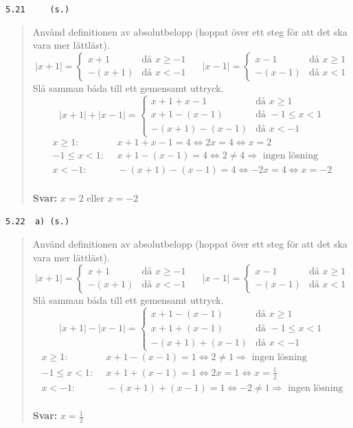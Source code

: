 \documentclass[a4paper]{article}
\newcommand{\tskcol}[1]{\textcolor{tskcol}{#1}}
\begin{document}
	\pagebreak
	\texttt{\tskcol{5.21~~~~ (s.)}}
	\begin{quotation}
		\noindent
		Använd definitionen av absolutbelopp (hoppat över ett steg för att det ska vara mer lättläst).
		\[|x+1|=
		\begin{cases}
		x+1&    \text{då } x \ge -1\\
		-(x+1)& \text{då } x < -1
		\end{cases}~~~~~~
		|x-1|=
		\begin{cases}
		x-1&    \text{då } x \ge 1\\
		-(x-1)& \text{då } x < 1
		\end{cases}\]
		Slå samman båda till ett gemensamt uttryck.
		\[|x+1|+|x-1|=
		\begin{cases}
		x+1+x-1&    \text{då } x \ge 1\\
		x+1-(x-1)& \text{då } -1 \le x < 1 \\
		-(x+1)-(x-1)& \text{då } x < -1 
		\end{cases}\]
		\begin{align*}
		     x \ge 1:&~~ x+1+x-1 = 4 \Leftrightarrow 2x=4 \Leftrightarrow x=2\\
		-1 \le x < 1:&~~ x+1-(x-1) = 4 \Leftrightarrow 2 \neq 4 \Rightarrow \text{ ingen lösning}\\
		      x < -1:&~~ -(x+1)-(x-1) = 4 \Leftrightarrow -2x = 4 \Leftrightarrow x = -2
		\end{align*}
		\\
		\textbf{Svar:} $x=2$ eller $x=-2$
	\end{quotation}
	
	\texttt{\tskcol{5.22~~a) (s.)}}
	\begin{quotation}
		\noindent
		Använd definitionen av absolutbelopp (hoppat över ett steg för att det ska vara mer lättläst).
		\[|x+1|=
		\begin{cases}
		x+1&    \text{då } x \ge -1\\
		-(x+1)& \text{då } x < -1
		\end{cases}~~~~~~
		|x-1|=
		\begin{cases}
		x-1&    \text{då } x \ge 1\\
		-(x-1)& \text{då } x < 1
		\end{cases}\]
		Slå samman båda till ett gemensamt uttryck.
		\[|x+1|-|x-1|=
		\begin{cases}
		x+1-(x-1)&    \text{då } x \ge 1\\
		x+1+(x-1)& \text{då } -1 \le x < 1 \\
		-(x+1)+(x-1)& \text{då } x < -1 
		\end{cases}\]
		\begin{align*}
		     x \ge 1:&~~ x+1-(x-1) = 1 \Leftrightarrow 2 \neq 1 \Rightarrow \text{ ingen lösning}\\
		-1 \le x < 1:&~~ x+1+(x-1) = 1 \Leftrightarrow 2x = 1 \Leftrightarrow x = \frac{1}{2}\\
		      x < -1:&~~ -(x+1)+(x-1) = 1 \Leftrightarrow -2 \neq 1 \Rightarrow \text{ ingen lösning}
		\end{align*}
		\\
		\textbf{Svar:} $x = \frac{1}{2}$
	\end{quotation}
	
\end{document}
